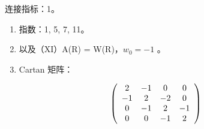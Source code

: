 连接指标：1。

\begin{enumerate}
\def\labelenumi{(\Roman{enumi})}
\setcounter{enumi}{8}
\item
  指数：1, 5, 7, 11。
\item
  以及（XI）A(R) = W(R)，\(w_{0} = -1\) 。
\item
  Cartan 矩阵：
\end{enumerate}

\[
\left( \begin{array}{c c c c} 2 & - 1 & 0 & 0 \\ - 1 & 2 & - 2 & 0 \\ 0 & - 1 & 2 & - 1 \\ 0 & 0 & - 1 & 2 \end{array} \right)
\]

